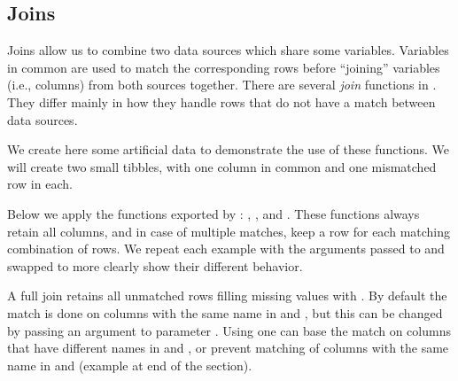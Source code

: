 \documentclass[krantz2]{krantz}\usepackage{knitr}
\begin{document}
\subsection{Joins}
Joins allow us to combine two data sources which share some variables. Variables in common are used to match the corresponding rows before ``joining'' variables (i.e., columns) from both sources together. There are several \emph{join} functions in . They differ mainly in how they handle rows that do not have a match between data sources.

We create here some artificial data to demonstrate the use of these functions. We will create two small tibbles, with one column in common and one mismatched row in each.



\begin{knitrout}\footnotesize
{}\color{fgcolor}\begin{kframe}
\begin{alltt}
 \hlkwb{<-} \hlstd{(} \hlstd{=} \hlstd{(}\hlopt{:}\hlstd{,} \hlstd{),}  \hlstd{=} \hlstd{)}
 \hlkwb{<-} \hlstd{(} \hlstd{=} \hlstd{(}\hlopt{:}\hlstd{,} \hlstd{),}  \hlstd{=} \hlstd{)}
\end{alltt}
\end{kframe}
\end{knitrout}

Below we apply the \emph{} functions exported by : , ,  and . These functions always retain all columns, and in case of multiple matches, keep a row for each matching combination of rows. We repeat each example with the arguments passed to  and  swapped to more clearly show their different behavior.

A full join retains all unmatched rows filling missing values with . By default the match is done on columns with the same name in  and , but this can be changed by passing an argument to parameter . Using  one can base the match on columns that have different names in  and , or prevent matching of columns with the same name in  and  (example at end of the section).
\end{document}
